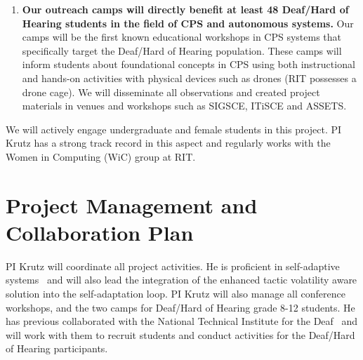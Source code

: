 \documentclass[11pt]{proposalnsf}
\newlength\q %
\begin{document}
\begin{sloppypar}
\begin{enumerate}[noitemsep]


\item \textbf{Our outreach camps will directly benefit at least 48 Deaf/Hard of Hearing students in the field of CPS and autonomous systems.} Our camps will be the first known educational workshops in CPS systems that specifically target the Deaf/Hard of Hearing population. These camps will inform students about foundational concepts in CPS using both instructional and hands-on activities with physical devices such as drones (RIT possesses a drone cage). We will disseminate all observations and created project materials in venues and workshops such as SIGSCE, ITiSCE and ASSETS.

\end{enumerate}

We will actively engage undergraduate and female students in this project. PI Krutz has a strong track record in this aspect and regularly works with the Women in Computing (WiC)\cite{wic_URL} group at RIT.

\section{Project Management and Collaboration Plan}

\noindent PI Krutz will coordinate all project activities. He is proficient in self-adaptive systems~\cite{7774954, Krutz2018SeamsTemp} and will also lead the integration of the enhanced tactic volatility aware solution into the self-adaptation loop. PI Krutz will also manage all conference workshops, and the two camps for Deaf/Hard of Hearing grade 8-12 students. He has previous collaborated with the National Technical Institute for the Deaf~\cite{7344327} and will work with them to recruit students and conduct activities for the Deaf/Hard of Hearing participants.



\end{sloppypar}
\end{document}

